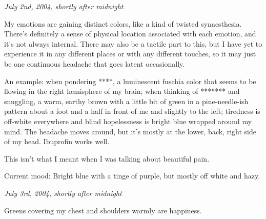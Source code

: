 \label{ally:8}
\begin{paracol}{2}
\begin{rightcolumn*}
  \begin{flushright}
    \emph{July 2nd, 2004, shortly after midnight}
  \end{flushright}
\end{rightcolumn*}
\begin{leftcolumn}
\noindent My emotions are gaining distinct colors, like a kind of twisted synaesthesia.  There's definitely a sense of physical location associated with each emotion, and it's not always internal.  There may also be a tactile part to this, but I have yet to experience it in any different places or with any different touches, so it may just be one continuous headache that goes latent occasionally.

An example: when pondering ****, a luminescent fuschia color that seems to be flowing in the right hemisphere of my brain; when thinking of ******* and snuggling, a warm, earthy brown with a little bit of green in a pine-needle-ish pattern about a foot and a half in front of me and slightly to the left; tiredness is off-white everywhere and blind hopelessness is bright blue wrapped around my mind.  The headache moves around, but it's mostly at the lower, back, right side of my head.  Ibuprofin works well.

This isn't what I meant when I was talking about beautiful pain.

Current mood: Bright blue with a tinge of purple, but mostly off white and hazy.
\end{leftcolumn}
\end{paracol}


\newpage

\begin{paracol}{2}
\begin{rightcolumn*}
  \begin{flushright}
    \emph{July 3rd, 2004, shortly after midnight}
  \end{flushright}
\end{rightcolumn*}
\begin{leftcolumn}
\noindent Greens covering my chest and shoulders warmly are happiness.
\vfill
\end{leftcolumn}
\end{paracol}



